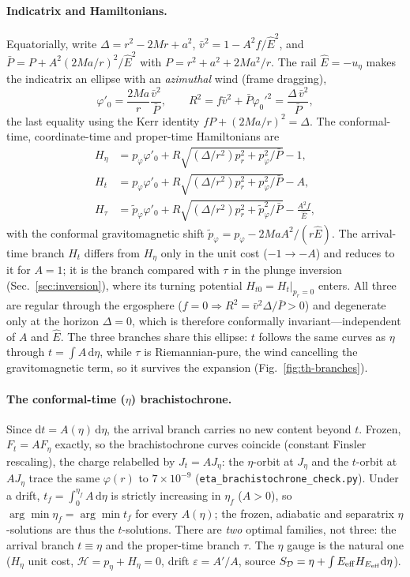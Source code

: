 \documentclass[
    aps, prd, twocolumn, superscriptaddress,
    showpacs, nofootinbib, floatfix
]{revtex4-2}
\newcommand{\Ehat}{\hat E}
\newcommand{\dd}{\mathrm{d}}
\begin{document}
\paragraph{Indicatrix and Hamiltonians.} Equatorially, write
$\Delta=r^2-2Mr+a^2$, $\bar v^2=1-A^2f/\Ehat^2$, and
$\bar P=P+A^2(2Ma/r)^2/\Ehat^2$ with $P=r^2+a^2+2Ma^2/r$. The rail
$\Ehat=-u_\eta$ makes the indicatrix an ellipse with an \emph{azimuthal} wind
(frame dragging),
\begin{equation}
    \varphi'_0=\frac{2Ma}{r}\frac{\bar v^2}{\bar P},\qquad
    R^2=f\bar v^2+\bar P\varphi_0'^2=\frac{\Delta\,\bar v^2}{\bar P},
    \label{eq:tk-ind}
\end{equation}
the last equality using the Kerr identity $fP+(2Ma/r)^2=\Delta$. The
conformal-time, coordinate-time and proper-time Hamiltonians are
\begin{align}
    H_\eta&=p_\varphi\varphi'_0
        +R\sqrt{(\Delta/r^2)p_r^2+p_\varphi^2/\bar P}-1,
    \label{eq:Heta}\\
    H_t&=p_\varphi\varphi'_0
        +R\sqrt{(\Delta/r^2)p_r^2+p_\varphi^2/\bar P}-A,
    \label{eq:Ht-tk}\\
    H_\tau&=\tilde p_\varphi\varphi'_0
        +R\sqrt{(\Delta/r^2)p_r^2+\tilde p_\varphi^2/\bar P}-\frac{A^2 f}{\Ehat},
    \label{eq:Htau-tk}
\end{align}
with the conformal gravitomagnetic shift
$\tilde p_\varphi=p_\varphi-2MaA^2/(r\Ehat)$. The arrival-time branch $H_t$ differs
from $H_\eta$ only in the unit cost ($-1\to-A$) and reduces to it for $A=1$; it is
the branch compared with $\tau$ in the plunge inversion
(Sec.~\ref{sec:inversion}), where its turning potential
$H_{t0}=H_t|_{p_r=0}$ enters. All three are regular through the
ergosphere ($f=0\Rightarrow R^2=\bar v^2\Delta/\bar P>0$) and degenerate only at
the horizon $\Delta=0$, which is therefore conformally invariant---independent of
$A$ and $\Ehat$. The three branches share this ellipse: $t$ follows the same
curves as $\eta$ through $t=\int A\,\dd\eta$, while $\tau$ is Riemannian-pure, the
wind cancelling the gravitomagnetic term, so it survives the expansion
(Fig.~\ref{fig:th-branches}).

\paragraph{The conformal-time ($\eta$) brachistochrone.} Since $\dd t=A(\eta)\,\dd\eta$,
the arrival branch carries no new content beyond $t$. Frozen, $F_t=A F_\eta$ exactly, so
the brachistochrone curves coincide (constant Finsler rescaling), the charge relabelled by
$J_t=A J_\eta$: the $\eta$-orbit at $J_\eta$ and the $t$-orbit at $A J_\eta$ trace the same
$\varphi(r)$ to $7\times10^{-9}$ (\texttt{eta\_brachistochrone\_check.py}). Under a drift,
$t_f=\int_0^{\eta_f}A\,\dd\eta$ is strictly increasing in $\eta_f$ ($A>0$), so
$\arg\min\eta_f=\arg\min t_f$ for every $A(\eta)$; the frozen, adiabatic and separatrix
$\eta$-solutions are thus the $t$-solutions. There are \emph{two} optimal families, not
three: the arrival branch $t\equiv\eta$ and the proper-time branch $\tau$. The $\eta$ gauge
is the natural one ($H_\eta$ unit cost, $\mathcal H=p_\eta+H_\eta=0$, drift $\varepsilon=A'/A$,
source $S_{\mathcal D}=\eta+\int E_{\rm eff}H_{E_{\rm eff}}\dd\eta$).
\end{document}
